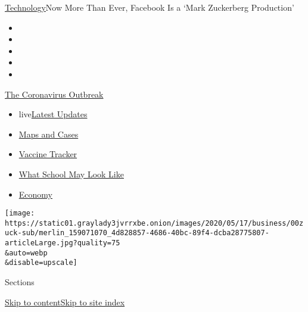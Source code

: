 \href{/section/technology}{Technology}\textbar{}Now More Than Ever,
Facebook Is a `Mark Zuckerberg Production'

\begin{itemize}
\item
\item
\item
\item
\item
\end{itemize}

\href{https://www.nytimes3xbfgragh.onion/news-event/coronavirus?action=click\&pgtype=Article\&state=default\&region=TOP_BANNER\&context=storylines_menu}{The
Coronavirus Outbreak}

\begin{itemize}
\tightlist
\item
  live\href{https://www.nytimes3xbfgragh.onion/2020/08/01/world/coronavirus-covid-19.html?action=click\&pgtype=Article\&state=default\&region=TOP_BANNER\&context=storylines_menu}{Latest
  Updates}
\item
  \href{https://www.nytimes3xbfgragh.onion/interactive/2020/us/coronavirus-us-cases.html?action=click\&pgtype=Article\&state=default\&region=TOP_BANNER\&context=storylines_menu}{Maps
  and Cases}
\item
  \href{https://www.nytimes3xbfgragh.onion/interactive/2020/science/coronavirus-vaccine-tracker.html?action=click\&pgtype=Article\&state=default\&region=TOP_BANNER\&context=storylines_menu}{Vaccine
  Tracker}
\item
  \href{https://www.nytimes3xbfgragh.onion/interactive/2020/07/29/us/schools-reopening-coronavirus.html?action=click\&pgtype=Article\&state=default\&region=TOP_BANNER\&context=storylines_menu}{What
  School May Look Like}
\item
  \href{https://www.nytimes3xbfgragh.onion/live/2020/07/31/business/stock-market-today-coronavirus?action=click\&pgtype=Article\&state=default\&region=TOP_BANNER\&context=storylines_menu}{Economy}
\end{itemize}

\texttt{[image: https://static01.graylady3jvrrxbe.onion/images/2020/05/17/business/00zuck-sub/merlin\_159071070\_4d828857-4686-40bc-89f4-dcba28775807-articleLarge.jpg?quality=75\\\&auto=webp\\\&disable=upscale]}

Sections

\protect\hyperlink{site-content}{Skip to
content}\protect\hyperlink{site-index}{Skip to site index}

